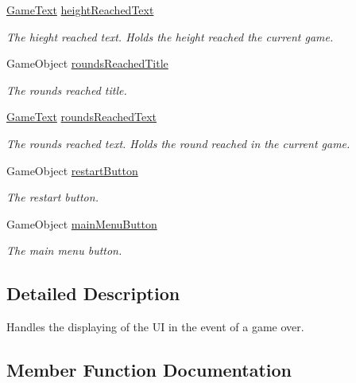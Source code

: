 \begin{DoxyCompactItemize}
\hyperlink{class_multi_stack_1_1_game_text}{Game\+Text} \hyperlink{class_multi_stack_1_1_game_over_u_i_a13eaa345c99a247a23a78f57dc570153}{height\+Reached\+Text}
\begin{DoxyCompactList}\small\item\em The hieght reached text. Holds the height reached the current game. \end{DoxyCompactList}\item 
Game\+Object \hyperlink{class_multi_stack_1_1_game_over_u_i_a4c5b2ff1188a2911cc30e340ef72c66e}{rounds\+Reached\+Title}
\begin{DoxyCompactList}\small\item\em The rounds reached title. \end{DoxyCompactList}\item 
\hyperlink{class_multi_stack_1_1_game_text}{Game\+Text} \hyperlink{class_multi_stack_1_1_game_over_u_i_a0033ad5b25bfd1e023887833069669b9}{rounds\+Reached\+Text}
\begin{DoxyCompactList}\small\item\em The rounds reached text. Holds the round reached in the current game. \end{DoxyCompactList}\item 
Game\+Object \hyperlink{class_multi_stack_1_1_game_over_u_i_a7c0173e7b31a3367c9b75cc1a384c56e}{restart\+Button}
\begin{DoxyCompactList}\small\item\em The restart button. \end{DoxyCompactList}\item 
Game\+Object \hyperlink{class_multi_stack_1_1_game_over_u_i_a4e55a5b8332763f189d1c38877928f5a}{main\+Menu\+Button}
\begin{DoxyCompactList}\small\item\em The main menu button. \end{DoxyCompactList}\end{DoxyCompactItemize}


\subsection{Detailed Description}
Handles the displaying of the U\+I in the event of a game over. 



\subsection{Member Function Documentation}
\hypertarget{class_multi_stack_1_1_game_over_u_i_a551012fc4da6e0ab26ec36769f890d3e}{}
